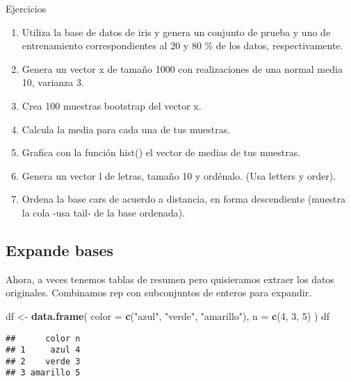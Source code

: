 \documentclass[]{article}
\newenvironment{Shaded}{\begin{snugshade}}{\end{snugshade}}
\newcommand{\KeywordTok}[1]{\textcolor[rgb]{0.13,0.29,0.53}{\textbf{{#1}}}}
\newcommand{\DataTypeTok}[1]{\textcolor[rgb]{0.13,0.29,0.53}{{#1}}}
\newcommand{\DecValTok}[1]{\textcolor[rgb]{0.00,0.00,0.81}{{#1}}}
\newcommand{\StringTok}[1]{\textcolor[rgb]{0.31,0.60,0.02}{{#1}}}
\newcommand{\NormalTok}[1]{{#1}}
\begin{document}
\begin{bclogo}[
  couleur=llred,
  arrondi=0,
  logo=\bcstop,
  barre=none,
  noborder=true]{Ejercicios}
\begin{enumerate}
\item Utiliza la base de datos de iris y genera un conjunto de prueba y uno de entrenamiento correspondientes al 20 y 80 \% de los datos, respectivamente.
\item Genera un vector x de tamaño 1000 con realizaciones de una normal media 10, varianza 3. 
\item Crea 100 muestras bootstrap del vector x.
\item Calcula la media para cada una de tus muestras.
\item Grafica con la función hist() el vector de medias de tus muestras.
\item Genera un vector l de letras, tamaño 10 y ordénalo. (Usa letters y order).
\item Ordena la base cars de acuerdo a distancia, en forma descendiente (muestra la cola -usa tail- de la base ordenada).
\end{enumerate}
\end{bclogo}

\subsection{Expande bases}\label{expande-bases}

Ahora, a veces tenemos tablas de resumen pero quisieramos extraer los
datos originales. Combinamos rep con subconjuntos de enteros para
expandir.

\begin{Shaded}
\begin{Highlighting}[]
\NormalTok{df <-}\StringTok{ }\KeywordTok{data.frame}\NormalTok{(}
  \DataTypeTok{color =} \KeywordTok{c}\NormalTok{(}\StringTok{"azul"}\NormalTok{, }\StringTok{"verde"}\NormalTok{, }\StringTok{"amarillo"}\NormalTok{),}
  \DataTypeTok{n =} \KeywordTok{c}\NormalTok{(}\DecValTok{4}\NormalTok{, }\DecValTok{3}\NormalTok{, }\DecValTok{5}\NormalTok{)}
\NormalTok{)}
\NormalTok{df}
\end{Highlighting}
\end{Shaded}

\begin{verbatim}
##      color n
## 1     azul 4
## 2    verde 3
## 3 amarillo 5
\end{verbatim}

\begin{Shaded}
\end{Shaded}
\end{document}
